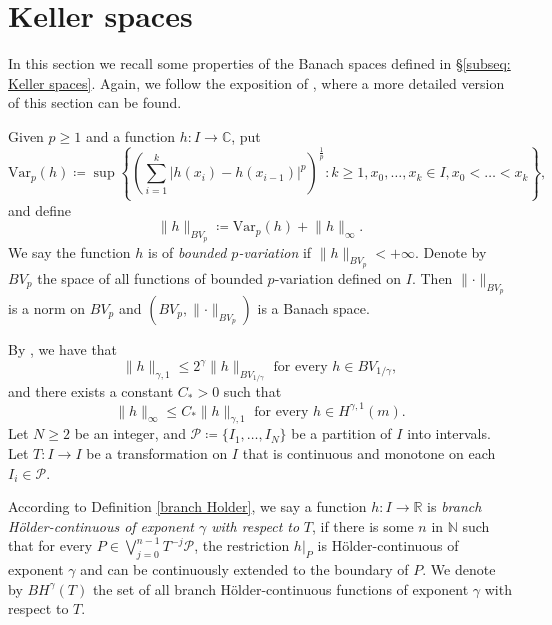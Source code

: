 \documentclass[12pt]{amsart}
\numberwithin{equation}{section} %
\numberwithin{figure}{section} %
\theoremstyle{plain}
\theoremstyle{definition}
\theoremstyle{remark}
\theoremstyle{citing}
\newcommand{\C}{\mathbb{C}}
\newcommand{\N}{\mathbb{N}}
\newcommand{\R}{\mathbb{R}}
\renewcommand{\=}{\coloneqq}
\begin{document}
\section{Keller spaces}\label{sec: Keller spaces}
In this section we recall some properties of the Banach spaces defined in \S\ref{subseq: Keller spaces}. Again, we follow the exposition of \cite{Juan1}, where a more detailed version of this section can be found.

Given $p\geq 1$ and a function $h\colon I\to\C$, put
\begin{equation*}
    \text{Var}_p(h)\= \sup\left\{\left(\sum_{i=1}^k |h(x_i)-h(x_{i-1})|^p\right)^{\frac{1}{p}} \colon k\geq 1,x_0,\ldots,x_k\in I, x_0<\ldots<x_k\right\},
\end{equation*}
and define
\begin{equation*}
    \lVert h \rVert_{BV_p} \= \text{Var}_p(h) + \lVert h \rVert_{\infty}. 
\end{equation*}
We say the function $h$ is of \emph{bounded $p$-variation} if $\lVert h \rVert_{BV_p}<+\infty$. Denote by $BV_p$ the space of all functions of bounded $p$-variation defined on $I$. Then $\lVert\cdot\rVert_{BV_p}$ is a norm on $BV_p$ and $(BV_p, \lVert\cdot\rVert_{BV_p} )$ is a Banach space. 

By \cite[Proposition 4.1]{Juan1}, we have that
\begin{equation}\label{contencion2 Keller}
    \lVert h \lVert_{\gamma,1}\leq 2^{\gamma}\lVert h \rVert_{BV_{1/\gamma}} \text{ for every } h\in BV_{1/\gamma},
\end{equation}
and there exists a constant $C_*>0$ such that
\begin{equation}\label{contencion3 Keller}
    \lVert h \rVert_{\infty} \leq C_* \lVert h \rVert_{\gamma,1} \text{ for every } h\in H^{\gamma,1}(m).
\end{equation}
Let $N\geq 2$ be an integer, and $\mathcal{P}\=\{I_1,\ldots,I_N\}$ be a partition of $I$ into intervals. Let $T\colon I\to I$ be a transformation on $I$ that is continuous and monotone on each $I_i\in \mathcal{P}$.

According to Definition \ref{branch Holder}, we say a function $h\colon I\to \R$ is \emph{branch Hölder-continuous of exponent $\gamma$ with respect to} $T$, if there is some $n$ in $\N$ such that for every $P \in \bigvee_{j=0}^{n-1}T^{-j}\mathcal{P}$, the restriction $h|_{P}$ is Hölder-continuous of exponent $\gamma$ and can be continuously extended to the boundary of $P$. We denote by $BH^{\gamma}(T)$ the set of all branch Hölder-continuous functions of exponent $\gamma$ with respect to $T$.
\end{document}
